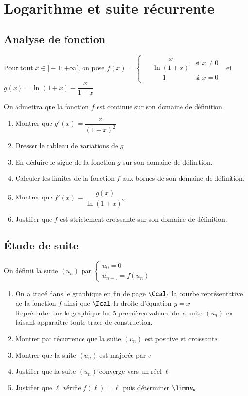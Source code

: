 \documentclass[oneside,12pt]{article}
\let\oldsection\section
\renewcommand{\section}{\newpage\oldsection}
\begin{document}
\section{Logarithme et suite récurrente}
\subsection{Analyse de fonction}

Pour tout $x\in]-1;+\infty[$, on pose $f(x)=\begin{cases}\begin{aligned}&\dfrac{x}{\ln(1+x)} & \text{si } x\neq0\\ &~~~~~~~1 & \text{si } x=0\end{aligned}\end{cases}$ et $g(x)=\ln(1+x)-\dfrac{x}{1+x}$



On admettra que la fonction $f$ est continue sur son domaine de définition.

\begin{enumerate}
    \item Montrer que $g'(x)=\dfrac{x}{(1+x)^2}$
    \item Dresser le tableau de variations de $g$
    \item En déduire le signe de la fonction $g$ sur son domaine de définition.
    \item Calculer les limites de la fonction $f$ aux bornes de son domaine de définition.
    \item Montrer que $f'(x)=\dfrac{g(x)}{\ln(1+x)^2}$
    \item Justifier que $f$ est strictement croissante sur son domaine de définition.
\end{enumerate}

\subsection{Étude de suite}
On définit la suite $(u_n)$ par $\begin{cases}u_0=0 \\ u_{n+1}=f(u_n)\end{cases}$

\begin{enumerate}
    \item On a tracé dans le graphique en fin de page $\Ccal_f$ la courbe représentative de la fonction $f$ ainsi que $\Dcal$ la droite d'équation $y=x$\\
    Représenter sur le graphique les 5 premières valeurs de la suite $(u_n)$ en faisant apparaître toute trace de construction.
    \item Montrer par récurrence que la suite $(u_n)$ est positive et croissante.
    \item Montrer que la suite $(u_n)$ est majorée par $e$
    \item Justifier que la suite $(u_n)$ converge vers un réel $\ell$
    \item Justifier que $\ell$ vérifie $f(\ell)=\ell$ puis déterminer $\limn u_n$
\end{enumerate}
\end{document}
